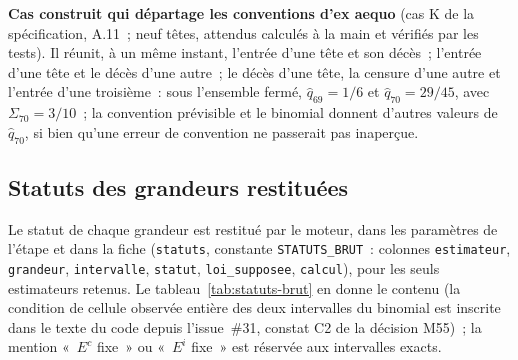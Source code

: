 \documentclass[a4paper,11pt]{article}
\newcommand{\code}[1]{\texttt{\small #1}}
\begin{document}
\noindent
\textbf{Cas construit qui départage les conventions d'ex aequo} (cas K de la
spécification, A.11~; neuf têtes, attendus calculés à la main et vérifiés par
les tests). Il réunit, à un même instant, l'entrée d'une tête et son
décès~; l'entrée d'une tête et le décès d'une autre~; le décès d'une tête, la
censure d'une autre et l'entrée d'une troisième~: sous l'ensemble fermé, $\hat q_{69} = 1/6$ et $\hat q_{70} = 29/45$, avec
$\Sigma_{70} = 3/10$~; la convention prévisible et le binomial donnent
d'autres valeurs de $\hat q_{70}$, si bien qu'une erreur de convention ne
passerait pas inaperçue.

\subsection{Statuts des grandeurs restituées}
\label{sec:brut-statuts}

Le statut de chaque grandeur est restitué par le moteur, dans les paramètres
de l'étape et dans la fiche (\code{statuts}, constante \code{STATUTS\_BRUT}~:
colonnes \code{estimateur}, \code{grandeur}, \code{intervalle},
\code{statut}, \code{loi\_supposee}, \code{calcul}), pour les seuls
estimateurs retenus. Le tableau~\ref{tab:statuts-brut} en donne le contenu
(la condition de cellule observée entière des deux intervalles du binomial
est inscrite dans le texte du code depuis l'issue~\#31, constat C2 de la
décision M55)~;
la mention «~$E^c$ fixe~» ou «~$E^i$ fixe~» est réservée aux intervalles
exacts.
\end{document}
